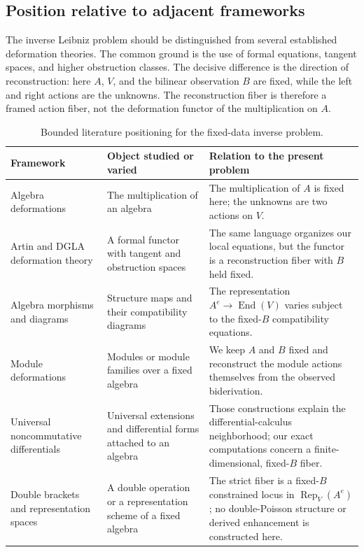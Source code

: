 \documentclass[11pt]{amsart}
\newcommand{\End}{\operatorname{End}}
\begin{document}
\subsection{Position relative to adjacent frameworks}\label{sec:literature-position}
The inverse Leibniz problem should be distinguished from several established deformation theories.  The common ground is the use of formal equations, tangent spaces, and higher obstruction classes.  The decisive difference is the direction of reconstruction: here $A$, $V$, and the bilinear observation $B$ are fixed, while the left and right actions are the unknowns.  The reconstruction fiber is therefore a framed action fiber, not the deformation functor of the multiplication on $A$.

\begin{table}[ht]
\centering
\small
\caption{Bounded literature positioning for the fixed-data inverse problem.}
\label{tab:framework-comparison}
\begin{tabular}{@{}>{\raggedright\arraybackslash}p{}>{\raggedright\arraybackslash}p{}>{\raggedright\arraybackslash}p{}@{}}
\toprule
Framework & Object studied or varied & Relation to the present problem \\
\midrule
Algebra deformations \cite{Gerstenhaber1964} & The multiplication of an algebra & The multiplication of $A$ is fixed here; the unknowns are two actions on $V$. \\
Artin and DGLA deformation theory \cite{Schlessinger1968,Manetti2005} & A formal functor with tangent and obstruction spaces & The same language organizes our local equations, but the functor is a reconstruction fiber with $B$ held fixed. \\
Algebra morphisms and diagrams \cite{GerstenhaberSchack1983,GerstenhaberSchack1985} & Structure maps and their compatibility diagrams & The representation $A^e\to\End(V)$ varies subject to the fixed-$B$ compatibility equations. \\
Module deformations \cite{Laudal2002} & Modules or module families over a fixed algebra & We keep $A$ and $B$ fixed and reconstruct the module actions themselves from the observed biderivation. \\
Universal noncommutative differentials \cite{CuntzQuillen1995} & Universal extensions and differential forms attached to an algebra & Those constructions explain the differential-calculus neighborhood; our exact computations concern a finite-dimensional, fixed-$B$ fiber. \\
Double brackets and representation spaces \cite{VanDenBergh2008,BerestKhachatryanRamadoss2013} & A double operation or a representation scheme of a fixed algebra & The strict fiber is a fixed-$B$ constrained locus in $\operatorname{Rep}_V(A^e)$; no double-Poisson structure or derived enhancement is constructed here. \\
\bottomrule
\end{tabular}
\end{table}
\end{document}
